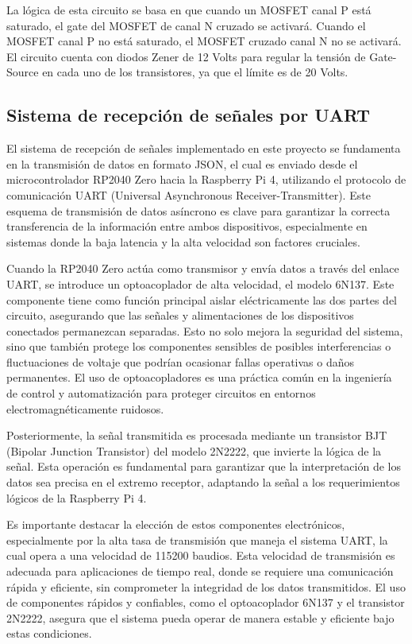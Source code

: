 \documentclass{article}
\begin{document}
La lógica de esta circuito se basa en que cuando un MOSFET canal P está saturado, el gate del MOSFET de canal N cruzado se activará. Cuando el MOSFET canal P no está saturado, el MOSFET cruzado canal N no se activará. El circuito cuenta con diodos Zener de 12 Volts para regular la tensión de Gate-Source en cada uno de los transistores, ya que el límite es de 20 Volts.


\subsection{Sistema de recepción de señales por UART}
El sistema de recepción de señales implementado en este proyecto se fundamenta en la transmisión de datos en formato JSON, el cual es enviado desde el microcontrolador RP2040 Zero hacia la Raspberry Pi 4, utilizando el protocolo de comunicación UART (Universal Asynchronous Receiver-Transmitter). Este esquema de transmisión de datos asíncrono es clave para garantizar la correcta transferencia de la información entre ambos dispositivos, especialmente en sistemas donde la baja latencia y la alta velocidad son factores cruciales.

Cuando la RP2040 Zero actúa como transmisor y envía datos a través del enlace UART, se introduce un optoacoplador de alta velocidad, el modelo 6N137. Este componente tiene como función principal aislar eléctricamente las dos partes del circuito, asegurando que las señales y alimentaciones de los dispositivos conectados permanezcan separadas. Esto no solo mejora la seguridad del sistema, sino que también protege los componentes sensibles de posibles interferencias o fluctuaciones de voltaje que podrían ocasionar fallas operativas o daños permanentes. El uso de optoacopladores es una práctica común en la ingeniería de control y automatización para proteger circuitos en entornos electromagnéticamente ruidosos.

Posteriormente, la señal transmitida es procesada mediante un transistor BJT (Bipolar Junction Transistor) del modelo 2N2222, que invierte la lógica de la señal. Esta operación es fundamental para garantizar que la interpretación de los datos sea precisa en el extremo receptor, adaptando la señal a los requerimientos lógicos de la Raspberry Pi 4.

Es importante destacar la elección de estos componentes electrónicos, especialmente por la alta tasa de transmisión que maneja el sistema UART, la cual opera a una velocidad de 115200 baudios. Esta velocidad de transmisión es adecuada para aplicaciones de tiempo real, donde se requiere una comunicación rápida y eficiente, sin comprometer la integridad de los datos transmitidos. El uso de componentes rápidos y confiables, como el optoacoplador 6N137 y el transistor 2N2222, asegura que el sistema pueda operar de manera estable y eficiente bajo estas condiciones.
\end{document}
